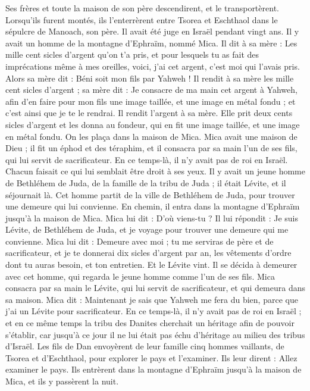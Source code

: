\begin{multicols}{2}
Ses frères et toute la maison de son père descendirent, et le transportèrent. Lorsqu'ils furent montés, ils l'enterrèrent entre Tsorea et Eschthaol dans le sépulcre de Manoach, son père. Il avait été juge en Israël pendant vingt ans.
\VerseOne{}Il y avait un homme de la montagne d'Ephraïm, nommé Mica.
Il dit à sa mère : Les mille cent sicles d'argent qu'on t'a pris, et pour lesquels tu as fait des imprécations même à mes oreilles, voici, j'ai cet argent, c'est moi qui l'avais pris. Alors sa mère dit : Béni soit mon fils par Yahweh !
Il rendit à sa mère les mille cent sicles d'argent ; sa mère dit : Je consacre de ma main cet argent à Yahweh, afin d'en faire pour mon fils une image taillée, et une image en métal fondu ; et c'est ainsi que je te le rendrai.
Il rendit l'argent à sa mère. Elle prit deux cents sicles d'argent et les donna au fondeur, qui en fit une image taillée, et une image en métal fondu.  On les plaça dans la maison de Mica.
Mica avait une maison de Dieu ;  il fit un éphod et des téraphim, et il consacra par sa main l'un de ses fils, qui lui servit de sacrificateur.
En ce temps-là, il n'y avait pas de roi en Israël. Chacun faisait ce qui lui semblait être droit à ses yeux.
Il y avait un jeune homme de Bethléhem de Juda, de la famille de la tribu de Juda ; il était Lévite, et il séjournait là.
Cet homme partit de la ville de Bethléhem de Juda, pour trouver une demeure qui lui convienne.  En chemin, il entra dans la montagne d'Ephraïm jusqu'à la maison de Mica.
Mica lui dit : D'où viens-tu ? Il lui répondit : Je suis Lévite, de Bethléhem de Juda, et je voyage pour trouver une demeure qui me convienne.
Mica lui dit : Demeure avec moi ; tu me serviras de père et de sacrificateur, et je te donnerai dix sicles d'argent par an, les vêtements d'ordre dont tu auras besoin, et ton entretien. Et le Lévite vint.
Il se décida à demeurer avec cet homme, qui regarda le jeune homme comme l'un de ses fils.
Mica consacra par sa main le Lévite, qui lui servit de sacrificateur, et qui demeura dans sa maison.
Mica dit : Maintenant je sais que Yahweh me fera du bien, parce que j'ai un Lévite pour sacrificateur.
\VerseOne{}En ce temps-là,  il n'y avait pas de roi en Israël ; et en ce même temps la tribu des Danites cherchait un héritage afin de pouvoir s'établir, car jusqu'à ce jour il ne lui était pas échu d'héritage au milieu des tribus d'Israël.
Les fils de Dan envoyèrent de leur famille cinq hommes vaillants, de Tsorea et d'Eschthaol, pour explorer le pays et l'examiner. Ils leur dirent : Allez examiner le pays. Ils entrèrent dans la montagne d'Ephraïm jusqu'à la maison de Mica, et ils y passèrent la nuit.

\end{multicols}
